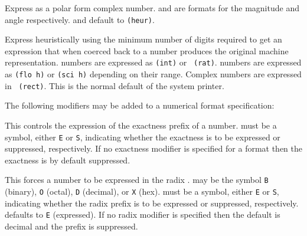 \begin{entry}{}

Express as a polar form complex number.   and  are formats
for the magnitude and angle respectively.   and  default to
{\tt (heur)}.

\end{entry}


\begin{entry}{}

Express heuristically using the minimum number of digits required to get an
expression that when coerced back to a number produces the original machine
representation.   numbers are expressed as {\tt (int)} or {\tt
(rat)}.   numbers are expressed as {\tt (flo h)} or {\tt (sci
h)} depending on their range.  Complex numbers are expressed in {\tt
(rect)}.  This is the normal default of the system printer.

\end{entry}

\bigskip

The following modifiers may be added to a numerical format specification:

\begin{entry}{}

This controls the expression of the exactness prefix of a number.  
must be a symbol, either {\tt E} or {\tt S}, indicating whether the
exactness is to be expressed or suppressed, respectively.  If no
exactness modifier is specified for a format then the exactness is by
default suppressed.  

\end{entry}


\begin{entry}{}

This forces a number to be expressed in the radix .   may be
the symbol {\tt B} (binary), {\tt O} (octal), {\tt D} (decimal), or {\tt X}
(hex).
 must be a symbol, either {\tt E} or {\tt S}, indicating whether
the radix prefix is to be expressed or suppressed, respectively.
 defaults to \hbox{\tt E} (expressed).  If no
radix modifier is specified then the default is decimal and the prefix is
suppressed.

\end{entry}


